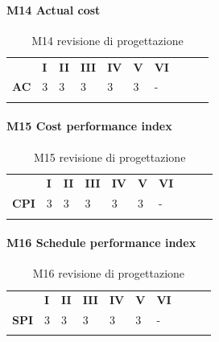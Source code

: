 \paragraph{M14 Actual cost} \mbox{}
\begin{longtable}[H!] {						
		>{}p{50mm}  		
		>{}p{8mm}
		>{}p{8mm}		
		>{}p{8mm}		
		>{}p{8mm}		
		>{}p{8mm}		
		>{}p{8mm}
		>{}p{8mm}
		>{}p{8mm}
		>{}p{8mm}
	}
	\rowcolor{gray!50}
	\textbf{} & \textbf{I} & \textbf{II} & \textbf{III} & \textbf{IV} & \textbf{V} & \textbf{VI} \TBstrut \\ [2mm]
	\textbf{AC} & 3 & 3 & 3 & 3 & 3 & - \TBstrut \\ [2mm]
	\rowcolor{white}
	\caption{M14 revisione di progettazione}
\end{longtable}
\paragraph{M15 Cost performance index} \mbox{}
\begin{longtable}[H!] {						
		>{}p{50mm}  		
		>{}p{8mm}
		>{}p{8mm}		
		>{}p{8mm}		
		>{}p{8mm}		
		>{}p{8mm}		
		>{}p{8mm}
		>{}p{8mm}
		>{}p{8mm}
		>{}p{8mm}
	}
	\rowcolor{gray!50}
	\textbf{} & \textbf{I} & \textbf{II} & \textbf{III} & \textbf{IV} & \textbf{V} & \textbf{VI} \TBstrut \\ [2mm]
	\textbf{CPI} & 3 & 3 & 3 & 3 & 3 & - \TBstrut \\ [2mm]
	\rowcolor{white}
	\caption{M15 revisione di progettazione}
\end{longtable}
\paragraph{M16 Schedule performance index} \mbox{}
\begin{longtable}[H!] {						
		>{}p{50mm}  		
		>{}p{8mm}
		>{}p{8mm}		
		>{}p{8mm}		
		>{}p{8mm}		
		>{}p{8mm}		
		>{}p{8mm}
		>{}p{8mm}
		>{}p{8mm}
		>{}p{8mm}
	}
	\rowcolor{gray!50}
	\textbf{} & \textbf{I} & \textbf{II} & \textbf{III} & \textbf{IV} & \textbf{V} & \textbf{VI} \TBstrut \\ [2mm]
	\textbf{SPI} & 3 & 3 & 3 & 3 & 3 & - \TBstrut \\ [2mm]
	\rowcolor{white}
	\caption{M16 revisione di progettazione}
\end{longtable}

